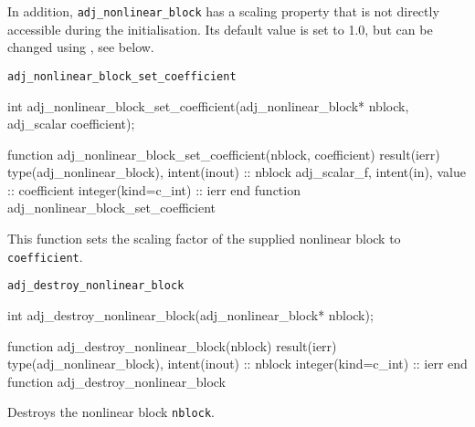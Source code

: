 In addition, \texttt{adj_nonlinear_block} has a scaling property that is not directly accessible during the initialisation. 
Its default value is set to 1.0, but can be changed using , see below.


\begin{boxwithtitle}{\texttt{adj_nonlinear_block_set_coefficient}}
\begin{minipage}{\columnwidth}
\begin{ccode}
  int adj_nonlinear_block_set_coefficient(adj_nonlinear_block* nblock, 
                                          adj_scalar coefficient);
\end{ccode}
\begin{fortrancode}
  function adj_nonlinear_block_set_coefficient(nblock, coefficient) result(ierr) 
    type(adj_nonlinear_block), intent(inout) :: nblock
    adj_scalar_f, intent(in), value :: coefficient
    integer(kind=c_int) :: ierr
  end function adj_nonlinear_block_set_coefficient
\end{fortrancode}
\end{minipage}
\end{boxwithtitle}

This function sets the scaling factor of the supplied nonlinear block to \texttt{coefficient}. 


\begin{boxwithtitle}{\texttt{adj_destroy_nonlinear_block}}
\begin{minipage}{\columnwidth}
\begin{ccode}
  int adj_destroy_nonlinear_block(adj_nonlinear_block* nblock);
\end{ccode}
\begin{fortrancode}
  function adj_destroy_nonlinear_block(nblock) result(ierr)
    type(adj_nonlinear_block), intent(inout) :: nblock
    integer(kind=c_int) :: ierr
  end function adj_destroy_nonlinear_block
\end{fortrancode}
\end{minipage}
\end{boxwithtitle}

Destroys the nonlinear block \texttt{nblock}.


